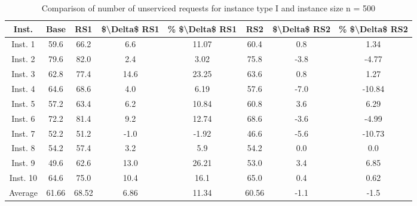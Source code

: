 \begin{table}[H]
\centering
\begin{tabular}{cccccccc}
  \hline
  \textbf{Inst.} & \textbf{Base} & \textbf{RS1} & \textbf{\$\textbackslash{}Delta\$  RS1} & \textbf{\% \$\textbackslash{}Delta\$  RS1} & \textbf{RS2} & \textbf{\$\textbackslash{}Delta\$  RS2} & \textbf{\% \$\textbackslash{}Delta\$  RS2} \\\hline
  Inst. 1 & 59.6 & 66.2 & 6.6 & 11.07 & 60.4 & 0.8 & 1.34 \\
  Inst. 2 & 79.6 & 82.0 & 2.4 & 3.02 & 75.8 & -3.8 & -4.77 \\
  Inst. 3 & 62.8 & 77.4 & 14.6 & 23.25 & 63.6 & 0.8 & 1.27 \\
  Inst. 4 & 64.6 & 68.6 & 4.0 & 6.19 & 57.6 & -7.0 & -10.84 \\
  Inst. 5 & 57.2 & 63.4 & 6.2 & 10.84 & 60.8 & 3.6 & 6.29 \\
  Inst. 6 & 72.2 & 81.4 & 9.2 & 12.74 & 68.6 & -3.6 & -4.99 \\
  Inst. 7 & 52.2 & 51.2 & -1.0 & -1.92 & 46.6 & -5.6 & -10.73 \\
  Inst. 8 & 54.2 & 57.4 & 3.2 & 5.9 & 54.2 & 0.0 & 0.0 \\
  Inst. 9 & 49.6 & 62.6 & 13.0 & 26.21 & 53.0 & 3.4 & 6.85 \\
  Inst. 10 & 64.6 & 75.0 & 10.4 & 16.1 & 65.0 & 0.4 & 0.62 \\
  Average & 61.66 & 68.52 & 6.86 & 11.34 & 60.56 & -1.1 & -1.5 \\\hline
\end{tabular}
\caption{Comparison of number of unserviced requests for instance type I and instance size n = 500}
\label{tab:wait:resrelocation-nTaxi-comparison_I_500}
\end{table}
